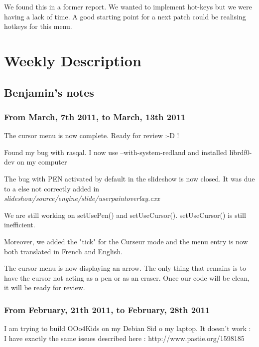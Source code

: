 \documentclass[a4paper,11pt]{article}
\begin{document}
We found this in a former report. We wanted to implement hot-keys but we were having a lack of time. A good starting point for a next patch could be realising hotkeys for this menu.

\newpage
{}
\fancyfoot[C]{\thepage}
\section*{Weekly Description}

\subsection*{Benjamin's notes}

\subsubsection*{From March, 7th 2011, to March, 13th 2011}

The cursor menu is now complete. Ready for review :-D !

Found my bug with rasqal. I now use --with-system-redland and installed librdf0-dev on my computer

The bug with PEN activated by default in the slideshow is now closed. It was due to a else{} not correctly added in \emph{slideshow/source/engine/slide/userpaintoverlay.cxx}

We are still working on setUsePen() and setUseCursor(). setUseCursor() is still inefficient.

Moreover, we added the "tick" for the Curseur mode and the menu entry is now both translated in French and English.

The cursor menu is now displaying an arrow. The only thing that remains is to have the cursor not acting as a pen or as an eraser. Once our code will be clean, it will be ready for review.

\subsubsection*{From February, 21th 2011, to February, 28th 2011}

I am trying to build OOo4Kids on my Debian Sid o my laptop.
It doesn't work : I have exactly the same issues described here : http://www.pastie.org/1598185
\end{document}

